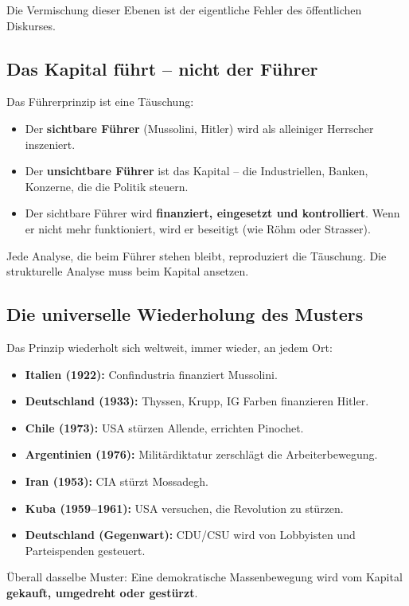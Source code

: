 Die Vermischung dieser Ebenen ist der eigentliche Fehler des öffentlichen Diskurses.

\subsection{Das Kapital führt – nicht der Führer}

Das Führerprinzip ist eine Täuschung:

\begin{itemize}
    \item Der \textbf{sichtbare Führer} (Mussolini, Hitler) wird als alleiniger Herrscher inszeniert.
    \item Der \textbf{unsichtbare Führer} ist das Kapital – die Industriellen, Banken, Konzerne, die die Politik steuern.
    \item Der sichtbare Führer wird \textbf{finanziert, eingesetzt und kontrolliert}. Wenn er nicht mehr funktioniert, wird er beseitigt (wie Röhm oder Strasser).
\end{itemize}

Jede Analyse, die beim Führer stehen bleibt, reproduziert die Täuschung. Die strukturelle Analyse muss beim Kapital ansetzen.

\subsection{Die universelle Wiederholung des Musters}

Das Prinzip wiederholt sich weltweit, immer wieder, an jedem Ort:

\begin{itemize}
    \item \textbf{Italien (1922):} Confindustria finanziert Mussolini.
    \item \textbf{Deutschland (1933):} Thyssen, Krupp, IG Farben finanzieren Hitler.
    \item \textbf{Chile (1973):} USA stürzen Allende, errichten Pinochet.
    \item \textbf{Argentinien (1976):} Militärdiktatur zerschlägt die Arbeiterbewegung.
    \item \textbf{Iran (1953):} CIA stürzt Mossadegh.
    \item \textbf{Kuba (1959--1961):} USA versuchen, die Revolution zu stürzen.
    \item \textbf{Deutschland (Gegenwart):} CDU/CSU wird von Lobbyisten und Parteispenden gesteuert.
\end{itemize}

Überall dasselbe Muster: Eine demokratische Massenbewegung wird vom Kapital \textbf{gekauft, umgedreht oder gestürzt}.